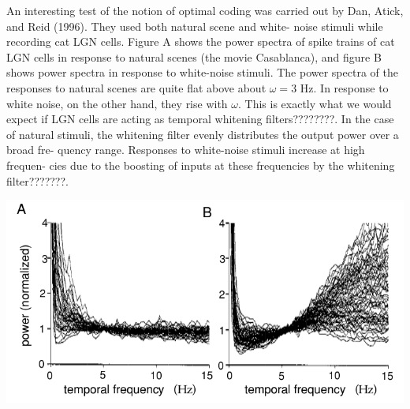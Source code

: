 \begin{exm}
  An interesting test of the notion of optimal coding was carried out by
Dan, Atick, and Reid (1996). They used both natural scene and white-
noise stimuli while recording cat LGN cells. Figure A shows the power spectra of spike trains of cat LGN cells in response to natural scenes (the
movie Casablanca), and figure B shows power spectra in response to
white-noise stimuli. The power spectra of the responses to natural scenes
are quite flat above about $\omega=3$ Hz. In response to white noise, on the
other hand, they rise with $\omega$. This is exactly what we would expect if LGN
cells are acting as temporal whitening filters????????. In the case of natural stimuli,
the whitening filter evenly distributes the output power over a broad fre-
quency range. Responses to white-noise stimuli increase at high frequen-
cies due to the boosting of inputs at these frequencies by the whitening
filter???????.
\begin{center}
  \label{fig:4-5}
  \includegraphics[scale = 0.35]{./png/4-5}
\end{center}
\end{exm}

